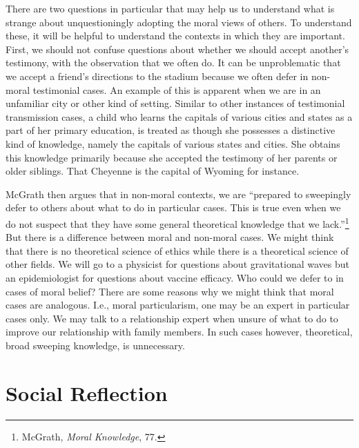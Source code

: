 \documentclass[
  12pt,
]{book}
\theoremstyle{definition}
\theoremstyle{definition}
\theoremstyle{definition}
\theoremstyle{definition}
\theoremstyle{remark}
\begin{document}
There are two questions in particular that may help us to understand what is strange about unquestioningly adopting the moral views of others. To understand these, it will be helpful to understand the contexts in which they are important. First, we should not confuse questions about whether we should accept another's testimony, with the observation that we often do. It can be unproblematic that we accept a friend's directions to the stadium because we often defer in non-moral testimonial cases. An example of this is apparent when we are in an unfamiliar city or other kind of setting. Similar to other instances of testimonial transmission cases, a child who learns the capitals of various cities and states as a part of her primary education, is treated as though she possesses a distinctive kind of knowledge, namely the capitals of various states and cities. She obtains this knowledge primarily because she accepted the testimony of her parents or older siblings. That Cheyenne is the capital of Wyoming for instance.

McGrath then argues that in non-moral contexts, we are ``prepared to sweepingly defer to others about what to do in particular cases. This is true even when we do not suspect that they have some general theoretical knowledge that we lack.''\footnote{McGrath, \emph{Moral {Knowledge}}, 77.} But there is a difference between moral and non-moral cases. We might think that there is no theoretical science of ethics while there is a theoretical science of other fields. We will go to a physicist for questions about gravitational waves but an epidemiologist for questions about vaccine efficacy. Who could we defer to in cases of moral belief? There are some reasons why we might think that moral cases are analogous. I.e., moral particularism, one may be an expert in particular cases only. We may talk to a relationship expert when unsure of what to do to improve our relationship with family members. In such cases however, theoretical, broad sweeping knowledge, is unnecessary.

\section{Social Reflection}\label{social-reflection}
\end{document}

